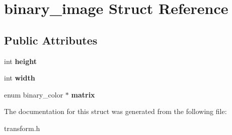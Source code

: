 \hypertarget{structbinary__image}{}\section{binary\+\_\+image Struct Reference}
\label{structbinary__image}
\subsection*{Public Attributes}
\begin{DoxyCompactItemize}
\item 
\mbox{\label{structbinary__image_add7b8fedbca88f52030475d1257fad8c}} 
int {\bfseries height}
\item 
\mbox{\label{structbinary__image_ab43306f2a3a22e9f9d6b43d2227b2019}} 
int {\bfseries width}
\item 
\mbox{\label{structbinary__image_a78c7dd6c5db3d6f18e3b8a3c18aff0ba}} 
enum binary\+\_\+color $\ast$ {\bfseries matrix}
\end{DoxyCompactItemize}


The documentation for this struct was generated from the following file\+:\begin{DoxyCompactItemize}
\item 
transform.\+h\end{DoxyCompactItemize}
